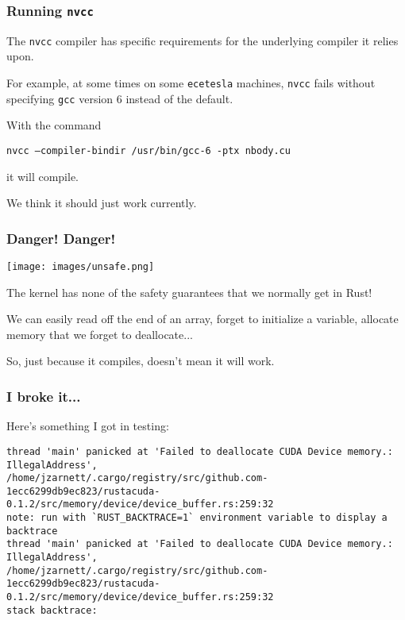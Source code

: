 \begin{frame}
\frametitle{Running \texttt{nvcc}}

The \texttt{nvcc} compiler has specific requirements for the underlying compiler it relies upon. 

For example, at some times on some \texttt{ecetesla} machines, \texttt{nvcc} fails without specifying \texttt{gcc} version 6 instead of the default. 

With the command
\vspace*{-4em}
\begin{center}
\texttt{nvcc --compiler-bindir /usr/bin/gcc-6 -ptx nbody.cu}
\end{center}
\vspace*{-2em}
it will compile.

We think it should just work currently.


\end{frame}


\begin{frame}
\frametitle{Danger! Danger!}

\begin{center}
	\texttt{[image: images/unsafe.png]}
\end{center}

The kernel has none of the safety guarantees that we normally get in Rust! 

We can easily read off the end of an array, forget to initialize a variable, allocate memory that we forget to deallocate...

So, just because it compiles, doesn't mean it will work.

\end{frame}


\begin{frame}[fragile]
\frametitle{I broke it...}

Here's something I got in testing:
{\tiny
\begin{verbatim}
thread 'main' panicked at 'Failed to deallocate CUDA Device memory.: IllegalAddress', 
/home/jzarnett/.cargo/registry/src/github.com-1ecc6299db9ec823/rustacuda-0.1.2/src/memory/device/device_buffer.rs:259:32
note: run with `RUST_BACKTRACE=1` environment variable to display a backtrace
thread 'main' panicked at 'Failed to deallocate CUDA Device memory.: IllegalAddress', 
/home/jzarnett/.cargo/registry/src/github.com-1ecc6299db9ec823/rustacuda-0.1.2/src/memory/device/device_buffer.rs:259:32
stack backtrace:
\end{verbatim}
}

\end{frame}


